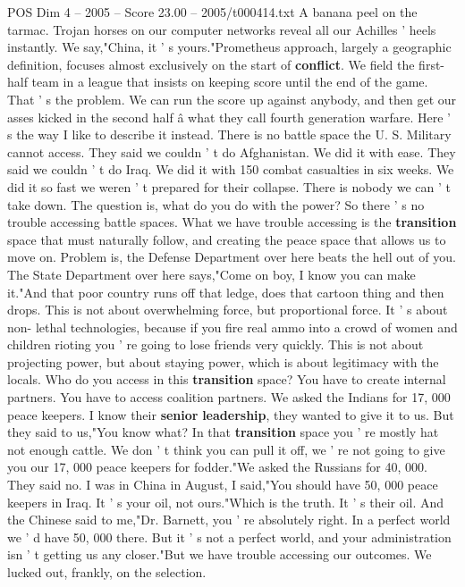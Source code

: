 \begin{textsample}{POS Dim 4 – 2005 – Score 23.00 – 2005/t000414.txt}
A banana peel on the tarmac.
Trojan horses on our computer networks reveal all our Achilles ' heels instantly.
We say,"China, it ' s yours."Prometheus approach, largely a geographic definition, focuses almost exclusively on the start of \textbf{conflict}.
We field the first-half team in a league that insists on keeping score until the end of the game.
That ' s the problem.
We can run the score up against anybody, and then get our asses kicked in the second half â what they call fourth generation warfare.
Here ' s the way I like to describe it instead.
There is no battle space the U.
S.
Military cannot access.
They said we couldn ' t do Afghanistan.
We did it with ease.
They said we couldn ' t do Iraq.
We did it with 150 combat casualties in six weeks.
We did it so fast we weren ' t prepared for their collapse.
There is nobody we can ' t take down.
The question is, what do you do with the power?
So there ' s no trouble accessing battle spaces.
What we have trouble accessing is the \textbf{transition} space that must naturally follow, and creating the peace space that allows us to move on.
Problem is, the Defense Department over here beats the hell out of you.
The State Department over here says,"Come on boy, I know you can make it."And that poor country runs off that ledge, does that cartoon thing and then drops.
This is not about overwhelming force, but proportional force.
It ' s about non- lethal technologies, because if you fire real ammo into a crowd of women and children rioting you ' re going to lose friends very quickly.
This is not about projecting power, but about staying power, which is about legitimacy with the locals.
Who do you access in this \textbf{transition} space?
You have to create internal partners.
You have to access coalition partners.
We asked the Indians for 17, 000 peace keepers.
I know their \textbf{senior} \textbf{leadership}, they wanted to give it to us.
But they said to us,"You know what?
In that \textbf{transition} space you ' re mostly hat not enough cattle.
We don ' t think you can pull it off, we ' re not going to give you our 17, 000 peace keepers for fodder."We asked the Russians for 40, 000.
They said no.
I was in China in August, I said,"You should have 50, 000 peace keepers in Iraq.
It ' s your oil, not ours."Which is the truth.
It ' s their oil.
And the Chinese said to me,"Dr.
Barnett, you ' re absolutely right.
In a perfect world we ' d have 50, 000 there.
But it ' s not a perfect world, and your administration isn ' t getting us any closer."But we have trouble accessing our outcomes.
We lucked out, frankly, on the selection.

\end{textsample}
